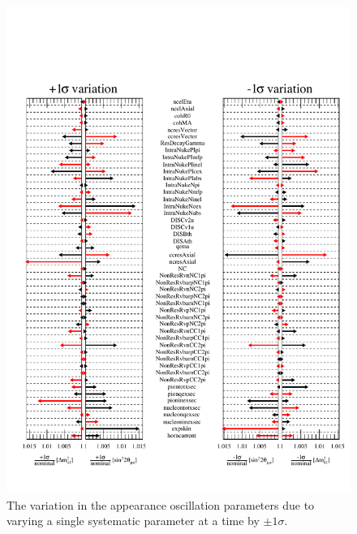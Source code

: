 \begin{figure}[h!]
    \centering
    \includegraphics[width = \largefigwidth]{figures-chap6/star_plot/nue_app_pulls.pdf}
    \caption[\nue appearance oscillation parameter pulls due to varying a single systematic parameter by $\pm1\sigma$.]{The variation in the \nue appearance oscillation parameters due to varying a single systematic parameter at a time by $\pm1\sigma$.}
    \label{fig:nue_app_osc_param_pulls}
\end{figure}

